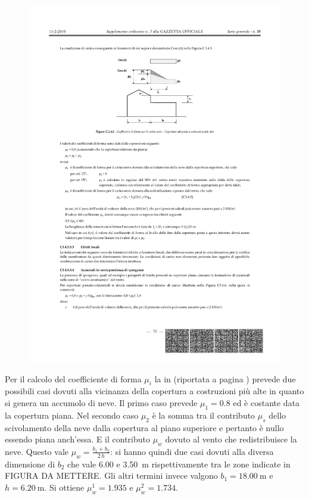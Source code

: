 \begin{figure}[htb]
\centering
\includegraphics{IMG/figC3-4-5.pdf}
\label{fig:C345}
\end{figure}
Per il calcolo del coefficiente di forma $\mu_i$ la  in  (riportata a pagina \pageref{fig:C345}) prevede due possibili casi dovuti alla vicinanza della copertura a costruzioni più alte in quanto si genera un accumolo di neve.
Il primo caso prevede $\mu_1=0.8$ ed è costante data la copertura piana. Nel secondo caso $\mu_2$ è la somma tra il contributo $\mu_s$ dello scivolamento della neve dalla copertura al piano superiore e pertanto è nullo essendo piana anch'essa. 
E il contributo $\mu_w$ dovuto al vento che redistribuisce la neve. 
Questo vale $\mu_w=\frac{b_1 + b_2}{2\,h}$: si hanno quindi due casi dovuti alla diversa dimensione di $b_2$ che vale \SI{6.00}{} e \SI{3.50}{\meter} rispettivamente tra le zone indicate in FIGURA DA METTERE.
Gli altri termini invece valgono $b_1=\SI{18.00}{\meter}$ e $h=\SI{6.20}{\meter}$. 
Si ottiene $\mu_w^1=1.935$ e $\mu_w^2=1.734$.

